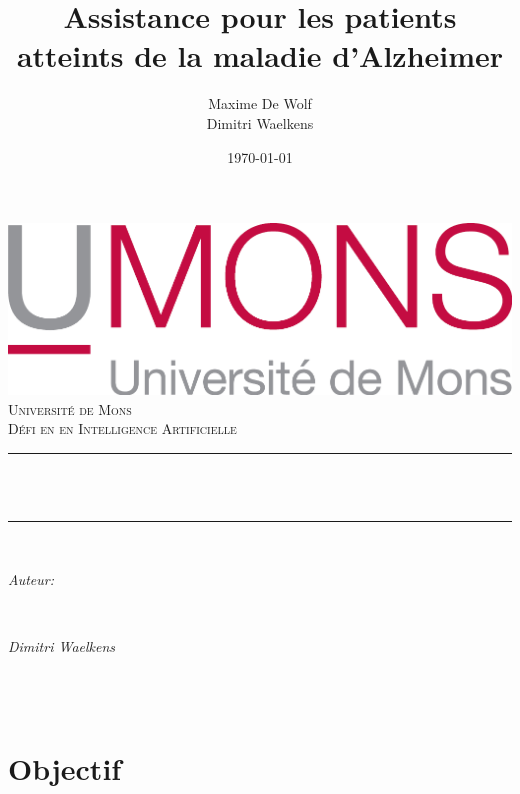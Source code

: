 \documentclass[10pt,a4paper]{article}
\title{Assistance pour les patients atteints de la maladie d'Alzheimer}                             %
\author{Maxime De Wolf\\
		Dimitri Waelkens}                               %
\date{\today}                                           %
\makeatletter
\let\thetitle\@title
\let\theauthor\@author
\let\thedate\@date
\makeatother
\begin{document}
   	
   	
   	\begin{titlepage}
   		\centering
   		\vspace*{0.5 cm}
   		\includegraphics[scale = 0.75]{UMONS}\\[1.0 cm]   %
   		\textsc{\LARGE Université de Mons}\\[2.0 cm]   %
   		\textsc{\large Défi en en Intelligence Artificielle}\\[0.5 cm]               %
   		\rule{\linewidth}{0.2 mm} \\[0.4 cm]
   		{ \huge \bfseries \thetitle}\\
   		\rule{\linewidth}{0.2 mm} \\[1.5 cm]
   		
   		\begin{minipage}{0.4\textwidth}
   			\begin{flushleft} \large
   				\emph{Auteur:}\\
   				\theauthor
   			\end{flushleft}
   		\end{minipage}~
   		\begin{minipage}{0.4\textwidth}
   			\begin{flushright} \large
   				\emph{Dimitri Waelkens}                                  %
   			\end{flushright}
   		\end{minipage}\\[2 cm]
   		
   		{\large \thedate}\\[2 cm]
   		
   		\vfill
   		
   	\end{titlepage}
   	
   	\section{Objectif}
   	
\end{document}
